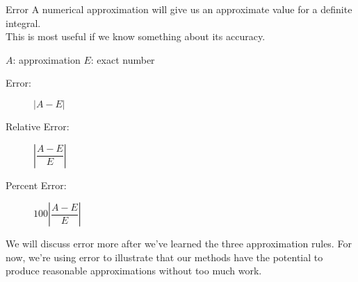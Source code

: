\begin{frame}[t]{Error}
A numerical approximation will give us an approximate value for a definite integral.
\\
This is most useful if we know something about its accuracy.
\vfill

  $A$: approximation \qquad   $E$: exact number\\[1em]

\begin{description}
\item[\alert{Error:}] \quad $|A-E|$
\item[\alert{Relative Error:}] \quad$\left|\dfrac{A-E}{E}\right|$
\item[\alert{Percent Error:}] \quad$100\left|\dfrac{A-E}{E}\right|$
\end{description}
\vfill
We will discuss error more after we've learned the three approximation rules. For now, we're using error to illustrate that our methods have the potential to produce reasonable approximations without too much work.
\end{frame}

